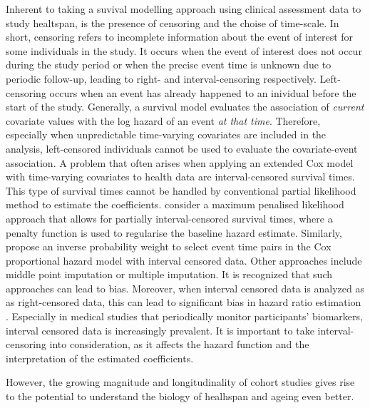 Inherent to taking a suvival modelling approach using clinical assessment data to study healtspan, is the presence of censoring and the choise of time-scale. In short, censoring refers to incomplete information about the event of interest for some individuals in the study. It occurs when the event of interest does not occur during the study period or when the precise event time is unknown due to periodic follow-up, leading to right- and interval-censoring respectively. Left-censoring occurs when an event has already happened to an inividual before the start of the study. Generally, a survival model evaluates the association of \textit{current} covariate values with the log hazard of an event \textit{at that time}. Therefore, especially when unpredictable time-varying covariates are included in the analysis, left-censored individuals cannot be used to evaluate the covariate-event association. A problem that often arises when applying an extended Cox model with time-varying covariates to health data are interval-censored survival times. This type of survival times cannot be handled by conventional partial likelihood method to estimate the coefficients. \cite{webb2023cox} consider a maximum penalised likelihood approach that allows for partially interval-censored survival times, where a penalty function is used to regularise the baseline hazard estimate. Similarly, \cite{heller2011proportional} propose an inverse probability weight to select event time pairs in the Cox proportional hazard model with interval censored data. Other approaches include middle point imputation or multiple imputation. It is recognized that such approaches can lead to bias. Moreover, when interval censored data is analyzed as as right-censored data, this can lead to significant bias in hazard ratio estimation \citep{sun2010comparison}. Especially in medical studies that periodically monitor participants' biomarkers, interval censored data is increasingly prevalent. It is important to take interval-censoring into consideration, as it affects the hazard function and the interpretation of the estimated coefficients.




However, the growing magnitude and longitudinality of cohort studies gives rise to the potential to understand the biology of healhspan and ageing even better. 